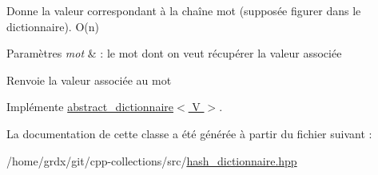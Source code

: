 Donne la valeur correspondant à la chaîne mot (supposée figurer dans le dictionnaire). O(n) 


\begin{DoxyParams}{Paramètres}
{\em mot} & \-: le mot dont on veut récupérer la valeur associée \\
\hline
\end{DoxyParams}
\begin{DoxyReturn}{Renvoie}
la valeur associée au mot 
\end{DoxyReturn}


Implémente \hyperlink{classabstract__dictionnaire_abf2426d66e5499582dc4dc4fe5eeb1c3}{abstract\-\_\-dictionnaire$<$ V $>$}.



La documentation de cette classe a été générée à partir du fichier suivant \-:\begin{DoxyCompactItemize}
\item 
/home/grdx/git/cpp-\/collections/src/\hyperlink{hash__dictionnaire_8hpp}{hash\-\_\-dictionnaire.\-hpp}\end{DoxyCompactItemize}
